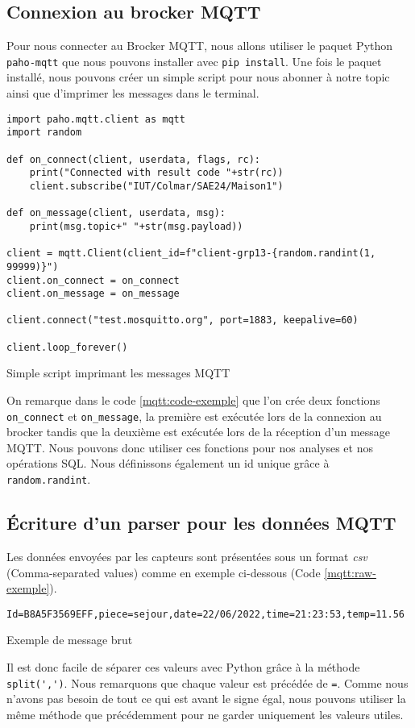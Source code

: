 \documentclass{article}
\begin{document}
    \subsection{Connexion au brocker MQTT}
    Pour nous connecter au Brocker MQTT, nous allons utiliser le paquet Python \verb|paho-mqtt| que nous pouvons installer avec \verb|pip install|.
    Une fois le paquet installé, nous pouvons créer un simple script pour nous abonner à notre topic ainsi que d'imprimer les messages dans le terminal.

    \begin{listing}[H]
        \begin{verbatim}
import paho.mqtt.client as mqtt
import random

def on_connect(client, userdata, flags, rc):
    print("Connected with result code "+str(rc))
    client.subscribe("IUT/Colmar/SAE24/Maison1")

def on_message(client, userdata, msg):
    print(msg.topic+" "+str(msg.payload))

client = mqtt.Client(client_id=f"client-grp13-{random.randint(1, 99999)}")
client.on_connect = on_connect
client.on_message = on_message

client.connect("test.mosquitto.org", port=1883, keepalive=60)

client.loop_forever()
        \end{verbatim}
        \caption{Simple script imprimant les messages MQTT}
        \label{mqtt:code-exemple}
    \end{listing}
    On remarque dans le code \ref{mqtt:code-exemple} que l'on crée deux fonctions \verb|on_connect| et \verb|on_message|, la première est exécutée lors de la connexion au brocker tandis que la deuxième est exécutée lors de la réception d'un message MQTT. 
    Nous pouvons donc utiliser ces fonctions pour nos analyses et nos opérations SQL.
    Nous définissons également un id unique grâce à \verb|random.randint|.

    \subsection{Écriture d'un parser pour les données MQTT}
    Les données envoyées par les capteurs sont présentées sous un format \emph{csv} (Comma-separated values) comme en exemple ci-dessous (Code \ref{mqtt:raw-exemple}). 
    \begin{listing}[H]
        \begin{verbatim}
Id=B8A5F3569EFF,piece=sejour,date=22/06/2022,time=21:23:53,temp=11.56
        \end{verbatim}
        \caption{Exemple de message brut}
        \label{mqtt:raw-exemple}
    \end{listing}
    Il est donc facile de séparer ces valeurs avec Python grâce à la méthode \verb|split(',')|. Nous remarquons que chaque valeur est précédée de \verb|=|. 
    Comme nous n'avons pas besoin de tout ce qui est avant le signe égal, nous pouvons utiliser la même méthode que précédemment pour ne garder uniquement les valeurs utiles.
\end{document}
